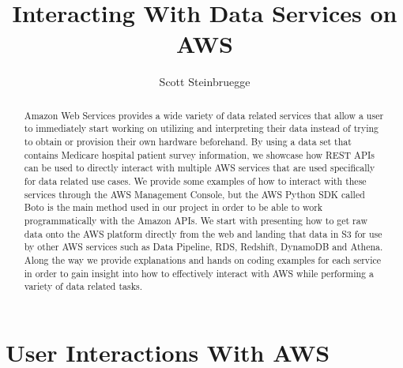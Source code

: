 
\title{Interacting With Data Services on AWS}

\author{Scott Steinbruegge}

\renewcommand{\shortauthors}{S. Steinbruegge}

\begin{abstract}
Amazon Web Services provides a wide variety of data related services that 
allow a user to immediately start working on utilizing and interpreting their 
data instead of trying to obtain or provision their own hardware beforehand. 
By using a data set that contains Medicare hospital patient survey 
information, we showcase how REST APIs can be used to directly interact with 
multiple AWS services that are used specifically for data related use cases. 
We provide some examples of how to interact with these services 
through the AWS Management Console, but the AWS Python SDK called Boto is the 
main method used in our project in order to be able to work programmatically 
with the Amazon APIs. We start with presenting how to get raw data onto the 
AWS platform directly from the web and landing that data in S3 for use by 
other AWS services such as Data Pipeline, RDS, Redshift, DynamoDB and Athena. 
Along the way we provide explanations and hands on coding examples for each 
service in order to gain insight into how to effectively interact with AWS 
while performing a variety of data related tasks. 
\end{abstract}


\maketitle

\section{User Interactions With AWS}

